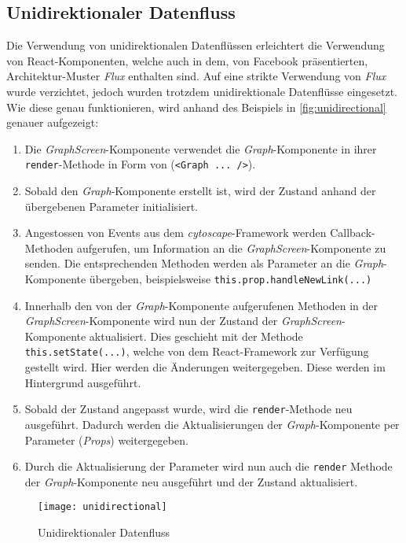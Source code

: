 \subsection[Datenfluss]{Unidirektionaler Datenfluss}\label{unidirectional}
Die Verwendung von unidirektionalen Datenflüssen erleichtert die Verwendung von React-Komponenten, welche auch in dem, von Facebook präsentierten, Architektur-Muster \textit{Flux} enthalten sind. Auf eine strikte Verwendung von \textit{Flux} wurde verzichtet, jedoch wurden trotzdem unidirektionale Datenflüsse eingesetzt. Wie diese genau funktionieren, wird anhand des Beispiels in \autoref{fig:unidirectional} genauer aufgezeigt: 
   \begin{enumerate}
     \item Die \textit{GraphScreen}-Komponente verwendet die \textit{Graph}-Komponente in ihrer \texttt{render}-Methode in Form von (\texttt{<Graph ... />}). 
     \item Sobald den \textit{Graph}-Komponente erstellt ist, wird der Zustand anhand der übergebenen Parameter initialisiert.
     \item Angestossen von \gls{Event}s aus dem \textit{cytoscape}-Framework werden \gls{Callback}-Methoden aufgerufen, um Information an die \textit{GraphScreen}-Komponente zu senden. Die entsprechenden Methoden werden als Parameter an die \textit{Graph}-Komponente übergeben, beispielsweise \texttt{this.prop.handleNewLink(...)}
     \item Innerhalb den von der \textit{Graph}-Komponente aufgerufenen Methoden in der \textit{GraphScreen}-Komponente wird nun der Zustand der \textit{GraphScreen}-Komponente aktualisiert. Dies geschieht mit der Methode \texttt{this.setState({...})}, welche von dem React-Framework zur Verfügung gestellt wird. Hier werden die Änderungen weitergegeben. Diese werden im Hintergrund ausgeführt.
     \item Sobald der Zustand angepasst wurde, wird die \texttt{render}-Methode neu ausgeführt. Dadurch werden die Aktualisierungen der \textit{Graph}-Komponente per Parameter (\textit{Props}) weitergegeben.
     \item Durch die Aktualisierung der Parameter wird nun auch die \texttt{render} Methode der \textit{Graph}-Komponente neu ausgeführt und der Zustand aktualisiert. 
   \end{enumerate}

\begin{figure}[htbp]
\centerline{\texttt{[image: unidirectional]}}
\caption {Unidirektionaler Datenfluss}
\label{fig:unidirectional}
\end{figure}


